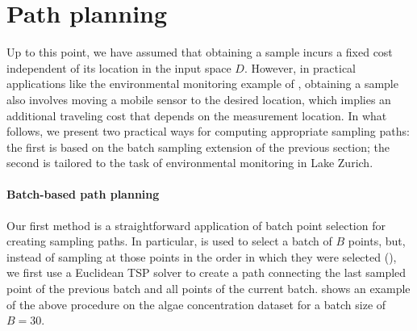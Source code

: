 \section{Path planning} \label{sect:pp} Up to this point, we have assumed that obtaining a sample incurs a fixed
cost independent of its location in the input space $D$. However, in practical
applications like the environmental monitoring example of ,
obtaining a sample also involves moving a mobile sensor to the desired
location, which implies an additional traveling cost that depends on the
measurement location. In what follows, we present two practical ways for
computing appropriate sampling paths: the first is based on the batch sampling
extension of the previous section; the second is tailored to the task of
environmental monitoring in Lake Zurich.

\paragraph{Batch-based path planning}
Our first method is a straightforward application of batch point selection for
creating sampling paths. In particular, \bacl is used to select a batch of
$B$ points, but, instead of sampling at those points in the order in which
they were selected (), we first use a
Euclidean TSP solver to create a path connecting the last sampled point of
the previous batch and all points of the current batch.
 shows an example of the above procedure
on the algae concentration dataset for a batch size of $B=30$.

